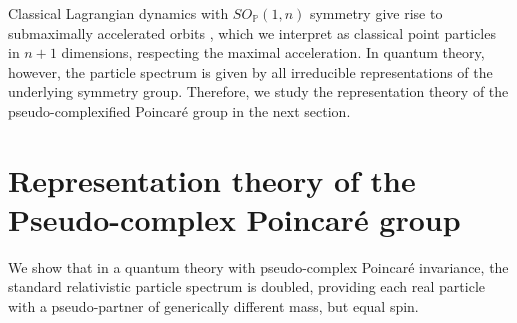 \documentclass[a4paper,aps,prd,showkeys,showpacs,superscriptaddress,preprint]{revtex4}
\newcommand{\pc}{\mathbb{P}}
\newcommand{\reals}{\mathbb{R}}
\begin{document}

Classical Lagrangian dynamics with $SO_\pc(1,n)$ symmetry give rise to
submaximally accelerated orbits \cite{Schuller:2002fn}, which we
interpret as classical point particles in $n+1$ dimensions, respecting the maximal
acceleration. In quantum theory, however, the particle spectrum is given by all irreducible
representations of the underlying symmetry group. Therefore, we study the
representation theory of the pseudo-complexified Poincar\'e group in
the next section.


\section{Representation theory of the Pseudo-complex Poincar\'e
group\label{sec_reptheory}}
We show that in a quantum theory with pseudo-complex Poincar\'e
invariance, the standard relativistic particle
spectrum is doubled, providing each real particle with a
pseudo-partner of generically different mass, but equal spin.\\
\end{document}
